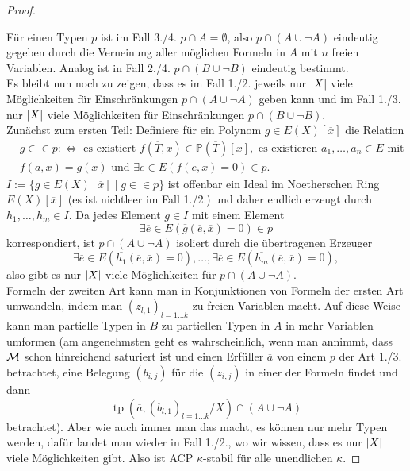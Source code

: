 \begin{proof}
\begin{enumerate}
	\end{enumerate}
	Für einen Typen $p$ ist im Fall 3./4. $p\cap A=\emptyset$, also $p\cap(A\cup\neg A)$ eindeutig gegeben durch die Verneinung aller möglichen Formeln in $A$ mit $n$ freien Variablen. Analog ist in Fall 2./4. $p\cap(B\cup\neg B)$ eindeutig bestimmt.\\
	Es bleibt nun noch zu zeigen, dass es im Fall 1./2. jeweils nur ${\left| X \right|}$ viele Möglichkeiten für Einschränkungen $p\cap(A\cup\neg A)$ geben kann und im Fall 1./3. nur ${\left| X \right|}$ viele Möglichkeiten für Einschränkungen $p\cap(B\cup\neg B)$.\\
	Zunächst zum ersten Teil: Definiere für ein Polynom $g\in E(X)[\overline{x}]$ die Relation
	\begin{align*}&g\in\in p:\Leftrightarrow\text{ es existiert }f(\overline{T},\overline{x})\in\mathbb{P}(\overline{T})[\overline{x}],\text{ es existieren }a_1,\dots,a_n\in E\text{ mit }\\
	&f(\overline{a},\overline{x})=g(\overline{x})\text{ und }\exists\overline{e}\in E(f(\overline{e},\overline{x})=0)\in p.
	\end{align*}
	$I:=\{g\in E(X)[\overline{x}]\mid g\in\in p\}$ ist offenbar ein Ideal im Noetherschen Ring $E(X)[\overline{x}]$ (es ist nichtleer im Fall 1./2.) und daher endlich erzeugt durch $h_1,\dots,h_m\in I$. Da jedes Element $g\in I$ mit einem Element $$\exists\overline{e}\in E(\overline{g}(\overline{e},\overline{x})=0)\in p$$ korrespondiert, ist $p\cap(A\cup\neg A)$ isoliert durch die übertragenen Erzeuger $$\exists\overline{e}\in E(\overline{h_1}(\overline{e},\overline{x})=0),\dots,\exists\overline{e}\in E(\overline{h_m}(\overline{e},\overline{x})=0),$$ also gibt es nur ${\left| X \right|}$ viele Möglichkeiten für $p\cap(A\cup\neg A)$.\\
	Formeln der zweiten Art kann man in Konjunktionen von Formeln der ersten Art umwandeln, indem man $(z_{l,1})_{l=1\dots k}$ zu freien Variablen macht. Auf diese Weise kann man partielle Typen in $B$ zu partiellen Typen in $A$ in mehr Variablen umformen (am angenehmsten geht es wahrscheinlich, wenn man annimmt, dass $\mathcal{M}$ schon hinreichend saturiert ist und einen Erfüller $\overline{a}$ von einem $p$ der Art 1./3. betrachtet, eine Belegung $(b_{i,j})$ für die $(z_{i,j})$ in einer der Formeln findet und dann $$\operatorname{tp}(\overline{a},(b_{l,1})_{l=1\dots k}/X)\cap(A\cup\neg A)$$ betrachtet). Aber wie auch immer man das macht, es können nur mehr Typen werden, dafür landet man wieder in Fall 1./2., wo wir wissen, dass es nur ${\left| X \right|}$ viele Möglichkeiten gibt. Also ist ACP $\kappa$-stabil für alle unendlichen $\kappa$.
\end{proof}